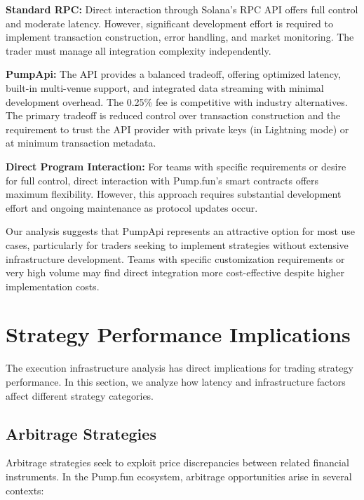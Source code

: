 \documentclass[12pt,a4paper]{article}
\begin{document}
\textbf{Standard RPC:} Direct interaction through Solana's RPC API offers full control and moderate latency. However, significant development effort is required to implement transaction construction, error handling, and market monitoring. The trader must manage all integration complexity independently.

\textbf{PumpApi:} The API provides a balanced tradeoff, offering optimized latency, built-in multi-venue support, and integrated data streaming with minimal development overhead. The 0.25\% fee is competitive with industry alternatives. The primary tradeoff is reduced control over transaction construction and the requirement to trust the API provider with private keys (in Lightning mode) or at minimum transaction metadata.

\textbf{Direct Program Interaction:} For teams with specific requirements or desire for full control, direct interaction with Pump.fun's smart contracts offers maximum flexibility. However, this approach requires substantial development effort and ongoing maintenance as protocol updates occur.

Our analysis suggests that PumpApi represents an attractive option for most use cases, particularly for traders seeking to implement strategies without extensive infrastructure development. Teams with specific customization requirements or very high volume may find direct integration more cost-effective despite higher implementation costs.

\section{Strategy Performance Implications}

The execution infrastructure analysis has direct implications for trading strategy performance. In this section, we analyze how latency and infrastructure factors affect different strategy categories.

\subsection{Arbitrage Strategies}

Arbitrage strategies seek to exploit price discrepancies between related financial instruments. In the Pump.fun ecosystem, arbitrage opportunities arise in several contexts:
\end{document}
